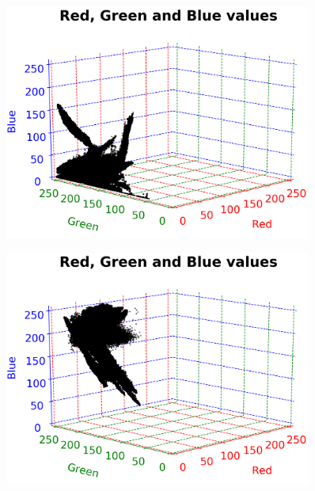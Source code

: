 \vspace{1mm}

\begin{figure}[h!]
	\centering
	\begin{minipage}{0.5\textwidth}
		\centering
		\includegraphics[width=0.9\textwidth]{img/rgbGreen.png}
		\captionsetup{width=0.9\textwidth}
		\label{rgbGreenPlot}
	\end{minipage}%
	\begin{minipage}{0.5\textwidth}
		\centering
		\includegraphics[width=0.9\textwidth]{img/rgbBlueGreen.png}
		\captionsetup{width=0.9\textwidth}
		\label{rgbBlueGreenPlot}
	\end{minipage}
\end{figure}

